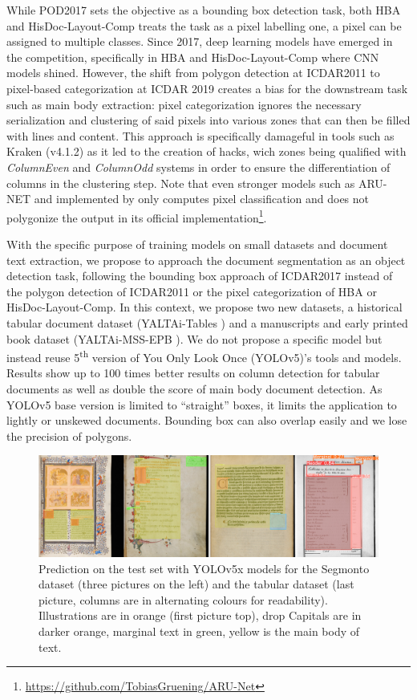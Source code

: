 \documentclass{jdmdh}
\begin{document}
While POD2017 sets the objective as a bounding box detection task, both HBA and HisDoc-Layout-Comp treats the task as a pixel labelling one, a pixel can be assigned to multiple classes. Since 2017, deep learning models have emerged in the competition, specifically in HBA and HisDoc-Layout-Comp where CNN models shined. However, the shift from polygon detection at ICDAR2011 to pixel-based categorization at ICDAR 2019 creates a bias for the downstream task such as main body extraction: pixel categorization ignores the necessary serialization and clustering of said pixels into various zones that can then be filled with lines and content. This approach is specifically damageful in tools such as Kraken (v4.1.2) as it led to the creation of hacks, wich zones being qualified with \textit{ColumnEven} and \textit{ColumnOdd} systems in order to ensure the differentiation of columns in the clustering step. Note that even stronger models such as ARU-NET and implemented by \citet{gruning2018arunet} only computes pixel classification and does not polygonize the output in its official implementation\footnote{\url{https://github.com/TobiasGruening/ARU-Net}}.

With the specific purpose of training models on small datasets and document text extraction, we propose to approach the document segmentation as an object detection task, following the bounding box approach of ICDAR2017 instead of the polygon detection of ICDAR2011 or the pixel categorization of HBA or HisDoc-Layout-Comp. In this context, we propose two new datasets, a historical tabular document dataset (YALTAi-Tables \citep{clerice_thibault_2022_6827706}) and a manuscripts and early printed book dataset (YALTAi-MSS-EPB \citep{clerice2022yaltaimss}). We do not propose a specific model but instead reuse 5\textsuperscript{th} version of You Only Look Once (YOLOv5)'s tools and models. Results show up to 100 times better results on column detection for tabular documents as well as double the score of main body document detection. As YOLOv5 base version is limited to ``straight'' boxes, it limits the application to lightly or unskewed documents. Bounding box can also overlap easily and we lose the precision of polygons.

\begin{figure}[ht]
    \centering
    \includegraphics[width=\linewidth]{images/4images.jpg}
    \caption{Prediction on the test set with YOLOv5x models for the Segmonto dataset (three pictures on the left) and the tabular dataset (last picture, columns are in alternating colours for readability). Illustrations are in orange (first picture top), drop Capitals are in darker orange, marginal text in green, yellow is the main body of text.}
    \label{fig:4images}
\end{figure}
\end{document}
